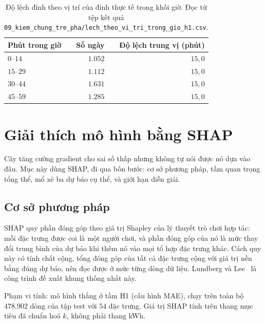 \documentclass[12pt, a4paper]{report}
\begin{document}
\begin{table}[htbp]
\centering
\caption{Độ lệch đỉnh theo vị trí của đỉnh thực tế trong khối giờ. Đọc từ tệp kết quả
\texttt{09\_kiem\_chung\_tre\_pha/lech\_theo\_vi\_tri\_trong\_gio\_h1.csv}.}
\label{tab:lech_theo_vi_tri}
\small
\begin{tabular}{l r r}
\toprule
\textbf{Phút trong giờ} & \textbf{Số ngày} & \textbf{Độ lệch trung vị (phút)} \\
\midrule
$0$--$14$  & $1.052$ & $15{,}0$ \\
$15$--$29$ & $1.112$ & $15{,}0$ \\
$30$--$44$ & $1.631$ & $15{,}0$ \\
$45$--$59$ & $1.285$ & $15{,}0$ \\
\bottomrule
\end{tabular}
\caption[Độ lệch đỉnh theo vị trí của đỉnh thực tế trong khối giờ]{Độ lệch đỉnh theo vị trí của đỉnh thực tế trong khối giờ. Đọc từ tệp kết quả
\texttt{09\_kiem\_chung\_tre\_pha/lech\_theo\_vi\_tri\_trong\_gio\_h1.csv}.}
\label{tab:lech_theo_vi_tri}
\end{table}

\FloatBarrier
\section{Giải thích mô hình bằng SHAP}

Cây tăng cường gradient cho sai số thấp nhưng không tự nói được nó dựa vào đâu. Mục này dùng
SHAP, đi qua bốn bước: cơ sở phương pháp, tầm quan trọng tổng thể, mổ xẻ ba dự báo cụ thể, và
giới hạn diễn giải.

\FloatBarrier
\subsection{Cơ sở phương pháp}

SHAP quy phần đóng góp theo giá trị Shapley của lý thuyết trò chơi hợp tác: mỗi đặc trưng được
coi là một người chơi, và phần đóng góp của nó là mức thay đổi trung bình của dự báo khi thêm
nó vào mọi tổ hợp đặc trưng khác. Cách quy này có tính chất cộng, tổng đóng góp của tất cả
đặc trưng cộng với giá trị nền bằng đúng dự báo, nên đọc được ở mức từng dòng dữ liệu.
Lundberg và Lee~\cite{lundberg2017shap} là công trình đề xuất khung thống nhất này.



Phạm vi tính: mô hình thắng ở tầm H1 (cấu hình MAE), chạy trên toàn bộ $478.902$ dòng của tập
test với $54$ đặc trưng. Giá trị SHAP tính trên thang mục tiêu đã chuẩn hoá $k$, không phải
thang kWh.
\end{document}
